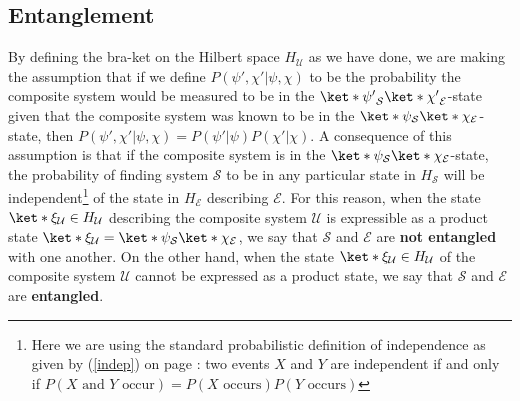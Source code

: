 \documentclass[12pt]{report}
\begin{document}
    \subsection{Entanglement}  
     By defining the bra-ket on the Hilbert space $H_\mathcal{U}$ as we have done, we are making the assumption that if we define $P(\psi',\chi'|\psi,\chi)$ to be the probability the composite system would be measured to be in the $\ket*{\psi'}_\mathcal{S}\ket*{\chi'}_\mathcal{E}$-state given that the composite system was known to be in the $\ket*{\psi}_\mathcal{S}\ket*{\chi}_\mathcal{E}$-state, then $P(\psi',\chi'|\psi,\chi)=P(\psi'|\psi)P(\chi'|\chi).$ A consequence of this assumption is that if the composite system is in the $\ket*{\psi}_\mathcal{S}\ket*{\chi}_\mathcal{E}$-state, the probability of finding system $\mathcal{S}$ to be in any particular state in $H_\mathcal{S}$ will be independent\footnote{Here we are using the standard probabilistic definition of independence as given by (\ref{indep}) on page \pageref{indep}: two events $X$ and $Y$ are independent if and only if $P(X \text{ and } Y\text{ occur})=P(X\text{ occurs})P(Y\text{ occurs})$} of the state in $H_\mathcal{E}$ describing $\mathcal{E}$. For this reason, when the state $\ket*{\xi}_\mathcal{U}\in H_\mathcal{U}$ describing the composite system $\mathcal{U}$ is expressible as a product state $\ket*{\xi}_\mathcal{U}=\ket*{\psi}_\mathcal{S}\ket*{\chi}_\mathcal{E}$,  we say that $\mathcal{S}$ and $\mathcal{E}$ are \textbf{not entangled} with one another. On the other hand, when  the state $\ket*{\xi}_\mathcal{U}\in H_\mathcal{U}$ of the composite system $\mathcal{U}$ cannot be expressed as a product state, we say that $\mathcal{S}$ and $\mathcal{E}$ are \textbf{entangled}.
\end{document}
